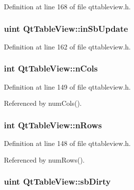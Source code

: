 Definition at line 168 of file qttableview.\+h.

\hypertarget{classQtTableView_a6d07c134a82e03acd902924440fc5f06}{
\subsubsection[{in\+Sb\+Update}]{\setlength{\rightskip}{0pt plus 5cm}uint Qt\+Table\+View\+::in\+Sb\+Update\hspace{0.3cm}{\ttfamily [private]}}}\label{classQtTableView_a6d07c134a82e03acd902924440fc5f06}


Definition at line 162 of file qttableview.\+h.

\hypertarget{classQtTableView_a9f81bc2413bfa7180fb904189172af21}{
\subsubsection[{n\+Cols}]{\setlength{\rightskip}{0pt plus 5cm}int Qt\+Table\+View\+::n\+Cols\hspace{0.3cm}{\ttfamily [private]}}}\label{classQtTableView_a9f81bc2413bfa7180fb904189172af21}


Definition at line 149 of file qttableview.\+h.



Referenced by num\+Cols().

\hypertarget{classQtTableView_abdb28f2e8488304db27f193c266b3e17}{
\subsubsection[{n\+Rows}]{\setlength{\rightskip}{0pt plus 5cm}int Qt\+Table\+View\+::n\+Rows\hspace{0.3cm}{\ttfamily [private]}}}\label{classQtTableView_abdb28f2e8488304db27f193c266b3e17}


Definition at line 148 of file qttableview.\+h.



Referenced by num\+Rows().

\hypertarget{classQtTableView_ae0b61b8debb05420d1d35db35fb1e396}{
\subsubsection[{sb\+Dirty}]{\setlength{\rightskip}{0pt plus 5cm}uint Qt\+Table\+View\+::sb\+Dirty\hspace{0.3cm}{\ttfamily [private]}}}\label{classQtTableView_ae0b61b8debb05420d1d35db35fb1e396}


